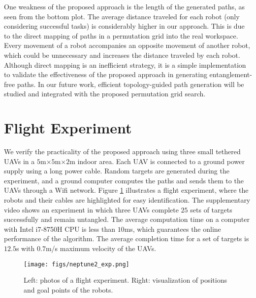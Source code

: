 \documentclass[conference]{IEEEtran}
\begin{document}
One weakness of the proposed approach is the length of the generated paths, as seen from the bottom plot.
The average distance traveled for each robot (only considering successful tasks) is considerably higher in our approach.
This is due to the direct mapping of paths in a permutation grid into the real workspace.
Every movement of a robot accompanies an opposite movement of another robot, which could be unnecessary and increases the distance traveled by each robot.
Although direct mapping is an inefficient strategy, it is a simple implementation to validate the effectiveness of the proposed approach in generating entanglement-free paths.
In our future work, efficient topology-guided path generation will be studied and integrated with the proposed permutation grid search.

\section{Flight Experiment}\label{sec: exp}
We verify the practicality of the proposed approach using three small tethered UAVs in a $5$m$\times5$m$\times2$m indoor area.
Each UAV is connected to a ground power supply using a long power cable.
Random targets are generated during the experiment, and a ground computer computes the paths and sends them to the UAVs through a Wifi network.
Figure \ref{fig: experiment} illustrates a flight experiment, where the robots and their cables are highlighted for easy identification.
The supplementary video shows an experiment in which three UAVs complete $25$ sets of targets successfully and remain untangled.
The average computation time on a computer with Intel i7-8750H CPU is less than $10$ms, which guarantees the online performance of the algorithm.
The average completion time for a set of targets is $12.5$s with $0.7$m/s maximum velocity of the UAVs.

\begin{figure}[!t]
\centering
\texttt{[image: figs/neptune2\_exp.png]}
\caption{\footnotesize Left: photos of a flight experiment. Right: visualization of positions and goal points of the robots.}
\label{fig: experiment}
\end{figure}

\end{document}
